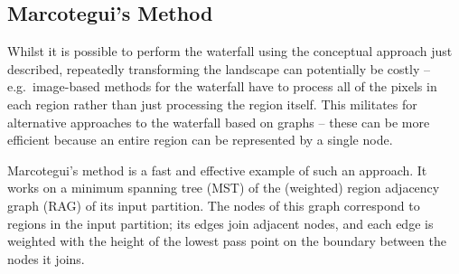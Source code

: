 \documentclass[a4paper]{article}
\begin{document}
\subsection{Marcotegui's Method}

Whilst it is possible to perform the waterfall using the conceptual approach just described, repeatedly transforming the landscape can potentially be costly -- e.g.~image-based methods for the waterfall have to process all of the pixels in each region rather than just processing the region itself. This militates for alternative approaches to the waterfall based on graphs -- these can be more efficient because an entire region can be represented by a single node.

Marcotegui's method \cite{marcotegui05} is a fast and effective example of such an approach. It works on a minimum spanning tree (MST) of the (weighted) region adjacency graph (RAG) of its input partition\footnotemark{}. The nodes of this graph correspond to regions in the input partition; its edges join adjacent nodes, and each edge is weighted with the height of the lowest pass point on the boundary between the nodes it joins.

\end{document}
